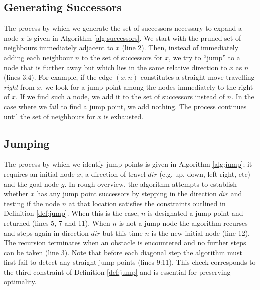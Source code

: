\subsection{Generating Successors}
The process by which we generate the set of successors necessary to expand a
node $x$ is given in Algorithm \ref{alg:successors}.
We start with the pruned set of neighbours immediately adjacent to $x$ (line 2).
Then, instead of immediately adding each neighbour $n$ to the set of successors
for $x$, we try to ``jump'' to a node that is further away but which lies in the 
same relative direction to $x$ as $n$ (lines 3:4). 
For example, if the edge $(x, n)$ constitutes a
straight move travelling \emph{right} from $x$, we look for a jump point among
the nodes immediately to the right of $x$.
If we find such a node, we add it to the set of successors instead of $n$.
In the case where we fail to find a jump point, we add nothing.
The process continues until the set of neighbours for $x$ is exhausted.



\subsection{Jumping}
The process by which we identfy jump points is given in Algorithm
\ref{alg:jump}; it requires an initial node $x$, a direction of travel $dir$
(e.g. up, down, left right, etc) and the goal node $g$.
In rough overview, the algorithm attempts to establish whether $x$ has any 
jump point successors by stepping in the direction $dir$ and testing
if the node $n$ at that location satisfies the constraints outlined in 
Definition \ref{def:jump}.
When this is the case, $n$ is designated a jump point and returned (lines 5, 7
and 11).
When $n$ is not a jump node the algorithm recurses and steps again in direction
$dir$ but this time $n$ is the new initial node (line 12).
The recursion terminates when an obstacle is encountered and no further
steps can be taken (line 3).
Note that before each diagonal step the algorithm must first 
fail to detect any straight jump points (lines 9:11). 
This check corresponds to the third constraint of Definition \ref{def:jump} 
and is essential for preserving optimality.
\par

